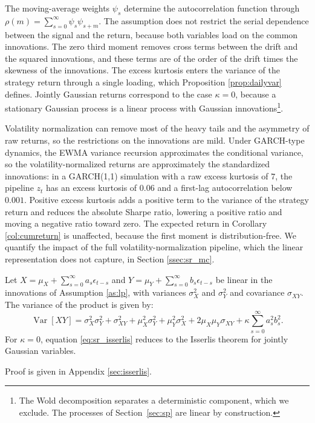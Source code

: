 \documentclass[hidelinks]{siamonline250211}
\DeclareMathOperator{\Var}{Var}
\begin{document}
The moving-average weights $\psi_{s}$ determine the autocorrelation function through $\rho(m)=\sum^{\infty}_{s=0}\psi_{s}\psi_{s+m}$. The assumption does not restrict the serial dependence between the signal and the return, because both variables load on the common innovations. The zero third moment removes cross terms between the drift and the squared innovations, and these terms are of the order of the drift times the skewness of the innovations. The excess kurtosis enters the variance of the strategy return through a single loading, which Proposition \ref{prop:dailyvar} defines. Jointly Gaussian returns correspond to the case $\kappa=0$, because a stationary Gaussian process is a linear process with Gaussian innovations\footnote{The Wold decomposition separates a deterministic component, which we exclude. The processes of Section~\ref{sec:sp} are linear by construction.}.

Volatility normalization can remove most of the heavy tails and the asymmetry of raw returns, so the restrictions on the innovations are mild. Under GARCH-type dynamics, the EWMA variance recursion approximates the conditional variance, so the volatility-normalized returns are approximately the standardized innovations: in a GARCH(1,1) simulation with a raw excess kurtosis of $7$, the pipeline $z_{t}$ has an excess kurtosis of $0.06$ and a first-lag autocorrelation below $0.001$. Positive excess kurtosis adds a positive term to the variance of the strategy return and reduces the absolute Sharpe ratio, lowering a positive ratio and moving a negative ratio toward zero. The expected return in Corollary \ref{col:cumreturn} is unaffected, because the first moment is distribution-free. We quantify the impact of the full volatility-normalization pipeline, which the linear representation does not capture, in Section \ref{ssec:sr_mc}.


\begin{lemma}\label{lem:isserlis}
	Let $X=\mu_{X}+\sum^{\infty}_{s=0}a_{s}\epsilon_{t-s}$ and $Y=\mu_{Y}+\sum^{\infty}_{s=0}b_{s}\epsilon_{t-s}$ be linear in the innovations of Assumption \ref{as:lp}, with variances $\sigma^{2}_{X}$ and $\sigma^{2}_{Y}$ and covariance $\sigma_{XY}$. The variance of the product is given by:
	\begin{equation} \label{eq:sr_isserlis}
		\Var\left[ XY \right] = \sigma^{2}_{X}\sigma^{2}_{Y} + \sigma^{2}_{XY} + \mu^{2}_{X}\sigma^{2}_{Y} + \mu^{2}_{Y}\sigma^{2}_{X} + 2\mu_{X}\mu_{Y}\sigma_{XY} + \kappa\sum^{\infty}_{s=0}a^{2}_{s}b^{2}_{s}.
	\end{equation}
	For $\kappa=0$, equation \eqref{eq:sr_isserlis} reduces to the Isserlis theorem for jointly Gaussian variables.
\end{lemma}
Proof is given in Appendix \ref{sec:isserlis}.
\end{document}
